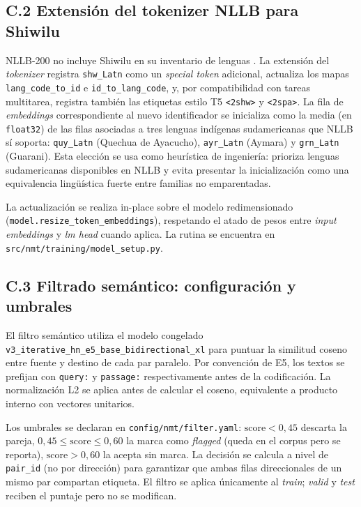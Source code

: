 \documentclass[12pt,a4paper,oneside]{book}
\newcommand{\filepath}[1]{\nolinkurl{#1}}
\begin{document}
\subsection*{C.2 Extensión del tokenizer NLLB para Shiwilu}\label{anexo-nmt-tokenizer}

NLLB-200 no incluye Shiwilu en su inventario de lenguas \parencite{nllb2022}. La extensión del \emph{tokenizer} registra \texttt{shw\_Latn} como un \emph{special token} adicional, actualiza los mapas \texttt{lang\_code\_to\_id} e \texttt{id\_to\_lang\_code}, y, por compatibilidad con tareas multitarea, registra también las etiquetas estilo T5 \texttt{<2shw>} y \texttt{<2spa>}. La fila de \emph{embeddings} correspondiente al nuevo identificador se inicializa como la media (en \texttt{float32}) de las filas asociadas a tres lenguas indígenas sudamericanas que NLLB sí soporta: \texttt{quy\_Latn} (Quechua de Ayacucho), \texttt{ayr\_Latn} (Aymara) y \texttt{grn\_Latn} (Guarani). Esta elección se usa como heurística de ingeniería: prioriza lenguas sudamericanas disponibles en NLLB y evita presentar la inicialización como una equivalencia lingüística fuerte entre familias no emparentadas.

La actualización se realiza in-place sobre el modelo redimensionado (\filepath{model.resize_token_embeddings}), respetando el atado de pesos entre \emph{input embeddings} y \emph{lm head} cuando aplica. La rutina se encuentra en \filepath{src/nmt/training/model_setup.py}.

\subsection*{C.3 Filtrado semántico: configuración y umbrales}\label{anexo-nmt-filtro}

El filtro semántico utiliza el modelo congelado \filepath{v3_iterative_hn_e5_base_bidirectional_xl} para puntuar la similitud coseno entre fuente y destino de cada par paralelo. Por convención de E5, los textos se prefijan con \texttt{query:} y \texttt{passage:} respectivamente antes de la codificación. La normalización L2 se aplica antes de calcular el coseno, equivalente a producto interno con vectores unitarios.

Los umbrales se declaran en \filepath{config/nmt/filter.yaml}: \(\text{score} < 0{,}45\) descarta la pareja, \(0{,}45 \leq \text{score} \leq 0{,}60\) la marca como \emph{flagged} (queda en el corpus pero se reporta), \(\text{score} > 0{,}60\) la acepta sin marca. La decisión se calcula a nivel de \texttt{pair\_id} (no por dirección) para garantizar que ambas filas direccionales de un mismo par compartan etiqueta. El filtro se aplica únicamente al \emph{train}; \emph{valid} y \emph{test} reciben el puntaje pero no se modifican.
\end{document}
